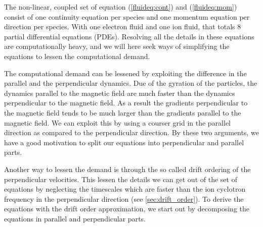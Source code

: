 The non-linear, coupled set of equation (\ref{fluideq:cont}) and (\ref{fluideq:mom}) consist of one continuity equation per species and one momentum equation per direction per species.
 With one electron fluid and one ion fluid, that totals $8$ partial differential equations (PDEs).
Resolving all the details in these equations are computationally heavy, and we will here seek ways of simplifying the equations to lessen the computational demand.

The computational demand can be lessened by exploiting the difference in the parallel and the perpendicular dynamics.
Due of the gyration of the particles, the dynamics parallel to the magnetic field are much faster than the dynamics perpendicular to the magnetic field.
As a result the gradients perpendicular to the magnetic field tends to be much larger than the gradients parallel to the magnetic field.
We can exploit this by using a courser grid in the parallel direction as compared to the perpendicular direction.
By these two arguments, we have a good motivation to split our equations into perpendicular and parallel parts.

Another way to lessen the demand is through the so called drift ordering of the perpendicular velocities.
 This lessen the details we can get out of the set of equations by neglecting the timescales which are faster than the ion cyclotron frequency in the perpendicular direction (see \cref{sec:drift_order}).
 To derive the equations with the drift order approximation, we start out by decomposing the equations in parallel and perpendicular parts.

